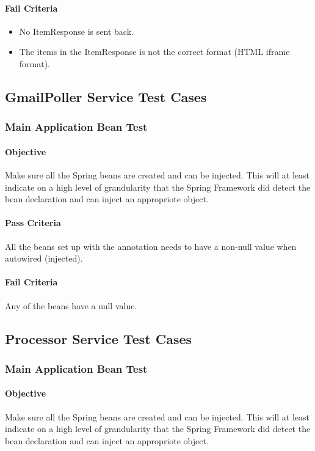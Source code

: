 \documentclass[hidelinks,english]{article}
\begin{document}
				\paragraph{Fail Criteria}
				\begin{itemize}
					\item No ItemResponse is sent back.
					\item The items in the ItemResponse is not the correct format (HTML iframe format).
				\end{itemize}
				
		\subsection{GmailPoller Service Test Cases}
			\subsubsection{Main Application Bean Test}\label{gmailapplicationbeanstest}
				\paragraph{Objective} Make sure all the Spring beans are created and can be injected. This will at least indicate on a high level of grandularity that the Spring Framework did detect the bean declaration and can inject an appropriote object.
				\paragraph{Pass Criteria} All the beans set up with the \emph{\@Bean} annotation needs to have a non-null value when autowired (injected).
				\paragraph{Fail Criteria} Any of the beans have a null value.
				
		\subsection{Processor Service Test Cases}
			\subsubsection{Main Application Bean Test}\label{processorapplicationbeanstest}
				\paragraph{Objective} Make sure all the Spring beans are created and can be injected. This will at least indicate on a high level of grandularity that the Spring Framework did detect the bean declaration and can inject an appropriote object.
\end{document}
